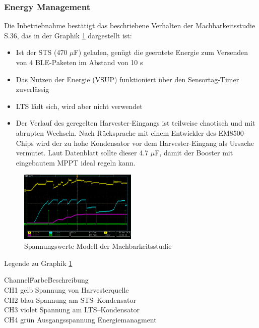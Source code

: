\subsubsection{Energy Management}
Die Inbetriebnahme bestätigt das beschriebene Verhalten der Machbarkeitsstudie \cite{PA_bicycle} S.36, das in der Graphik \ref{spannungMachbarkeit} dargestellt ist:
\begin{itemize}
 \item Ist der STS (470 $\mu$F) geladen, genügt die geerntete Energie zum Versenden von 4 BLE-Paketen im Abstand von 10 s
 \item Das Nutzen der Energie (VSUP) funktioniert über den Sensortag-Timer zuverlässig 
 \item LTS lädt sich, wird aber nicht verwendet 
 \item Der Verlauf des geregelten Harvester-Eingangs ist teilweise chaotisch und mit abrupten Wechseln. Nach Rücksprache mit einem Entwickler des EM8500-Chips wird der zu hohe Kondensator vor dem Harvester-Eingang als Ursache vermutet. Laut Datenblatt sollte dieser 4.7 $\mu$F, damit der Booster mit eingebautem MPPT ideal regeln kann.
\end{itemize} 

\begin{figure}[ht]
    \includegraphics[width=0.5\textwidth]{3Vorgehen/imag/messungPA.png}
    \caption{Spannungswerte Modell der Machbarkeitsstudie}\label{spannungMachbarkeit} 
\end{figure}

Legende zu Graphik \ref{spannungMachbarkeit}
\begin{tabbing}
    Channel\quad\= Farbe\quad\= Beschreibung\\[0.8ex]
    CH1\> gelb\> Spannung von Harvesterquelle\\
    CH2\> blau\> Spannung am STS--Kondensator\\
    CH3\> violet\> Spannung am LTS--Kondensator\\
    CH4\> grün\> Ausgangsspannung Energiemanagment\\
\end{tabbing}

